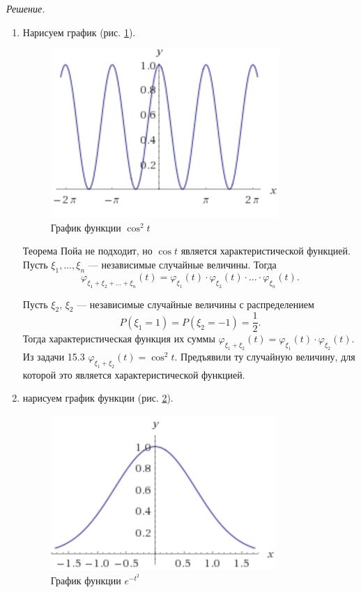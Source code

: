 \textit{Решение.}
\begin{enumerate}[label=\alph*)]
\item Нарисуем график (рис. \ref{fig:1562}).

\begin{figure}[h!]
  \centering
  \includegraphics[width=.4\textwidth]{./pictures/15_6_2.png}
  \caption{График функции $ \cos^2 t$}
  \label{fig:1562}
\end{figure}

Теорема Пойа не подходит, но $ \cos t$ является характеристической функцией.
Пусть $ \xi_1, \dotsc, \xi_n$ --- независимые случайные величины.
Тогда
$$ \varphi_{ \xi_1 + \xi_2 + \dotsc + \xi_n} \left( t \right) =
  \varphi_{ \xi_1} \left( t \right) \cdot \varphi_{ \xi_2} \left( t \right) \cdot \dotsc \cdot
  \varphi_{ \xi_n} \left( t \right).$$

Пусть $ \xi_2, \, \xi_2$ --- независимые случайные величины с распределением
$$P \left( \xi_1 = 1 \right) =
  P \left( \xi_2 = - 1 \right) =
  \frac{1}{2}.$$
Тогда характеристическая функция их суммы
$ \varphi_{ \xi_1 + \xi_2} \left( t \right) =
  \varphi_{ \xi_1} \left( t \right) \cdot \varphi_{ \xi_2} \left( t \right) $.
Из задачи 15.3 $ \varphi_{ \xi_1 + \xi_2} \left( t \right) = \cos^2 t$.
Предъявили ту случайную величину, для которой это является характеристической функцией.

\item нарисуем график функции (рис. \ref{fig:1561}).

\begin{figure}[h!]
  \centering
  \includegraphics[width=.4\textwidth]{./pictures/15_6_1.png}
  \caption{График функции $e^{- t^2}$}
  \label{fig:1561}
\end{figure}


\end{enumerate}
